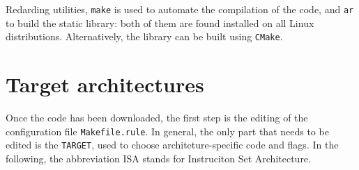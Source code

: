 \documentclass[a4paper]{report}
\begin{document}
Redarding utilities, {\tt make} is used to automate the compilation of the code, and {\tt ar} to build the static library: both of them are found installed on all Linux distributions.
Alternatively, the library can be built using {\tt CMake}.

\section{Target architectures}

Once the code has been downloaded, the first step is the editing of the configuration file {\tt Makefile.rule}.
In general, the only part that needs to be edited is the {\tt TARGET}, used to choose architeture-specific code and flags.
In the following, the abbreviation ISA stands for Instruciton Set Architecture.
\end{document}
